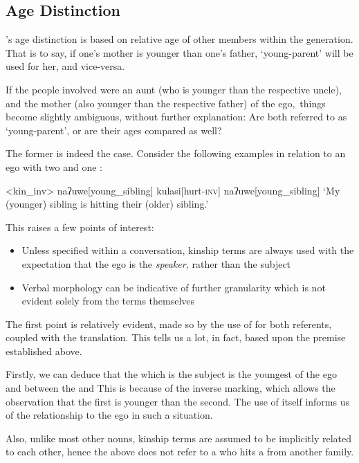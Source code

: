 \documentclass[openany, 12pt, b5paper, draft]{memoir}
\begin{document}
\subsection{Age Distinction}
\langname 's age distinction is based on relative age of other members within the generation. That is to say, if one's mother is younger than one's father, `young-parent' will be used for her, and vice-versa.

If the people involved were an aunt (who is younger than the respective uncle), and the mother (also younger than the respective father) of the ego,\footnotemark\ things become slightly ambiguous, without further explanation: Are both referred to as `young-parent', or are their ages compared as well?

The former is indeed the case. Consider the following examples in relation to an ego with two  and one :

\ex<kin_inv>
\begingl
naʔuwe[young\_sibling]
kulasi[hurt\textsc{-inv}]
naʔuwe[young\_sibling]
\glft `My (younger) sibling is hitting their (older) sibling.'
\endgl
\xe


This raises a few points of interest:
\begin{itemize}
  \item Unless specified within a conversation, kinship terms are always used with the expectation that the ego is the \textit{speaker,} rather than the subject
  \item Verbal morphology can be indicative of further granularity which is not evident solely from the terms themselves
\end{itemize}

The first point is relatively evident, made so by the use of  for both referents, coupled with the translation. This tells us a lot, in fact, based upon the premise established above.

Firstly, we can deduce that the  which is the subject is the youngest of the ego and between the  and  This is because of the inverse marking, which allows the observation that the first  is younger than the second. The use of  itself informs us of the relationship to the ego in such a situation.

Also, unlike most other nouns, kinship terms are assumed to be implicitly related to each other, hence the above does not refer to a  who hits a  from another family.
\end{document}
